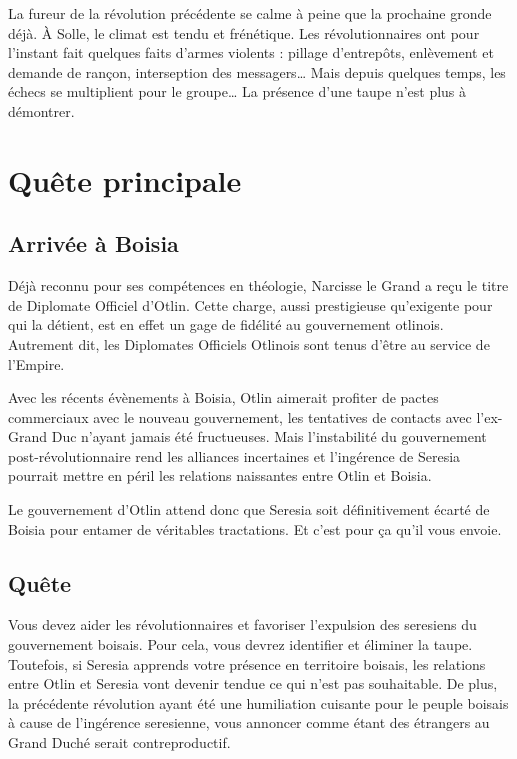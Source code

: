 \documentclass[french, a4paper, 12pt]{article}
\begin{document}
La fureur de la révolution précédente se calme à peine que la prochaine gronde déjà. À Solle, le climat est tendu et frénétique. Les révolutionnaires ont pour l'instant fait quelques faits d'armes violents : pillage d'entrepôts, enlèvement et demande de rançon, interseption des messagers… Mais depuis quelques temps, les échecs se multiplient pour le groupe… La présence d'une taupe n'est plus à démontrer.

\section{Quête principale}

\subsection{Arrivée à Boisia}

Déjà reconnu pour ses compétences en théologie, Narcisse le Grand a reçu le titre de Diplomate Officiel d'Otlin. Cette charge, aussi prestigieuse qu'exigente pour qui la détient, est en effet un gage de fidélité au gouvernement otlinois. Autrement dit, les Diplomates Officiels Otlinois sont tenus d'être au service de l'Empire.

Avec les récents évènements à Boisia, Otlin aimerait profiter de pactes commerciaux avec le nouveau gouvernement, les tentatives de contacts avec l'ex-Grand Duc n'ayant jamais été fructueuses. Mais l'instabilité du gouvernement post-révolutionnaire rend les alliances incertaines et l'ingérence de Seresia pourrait mettre en péril les relations naissantes entre Otlin et Boisia.

Le gouvernement d'Otlin attend donc que Seresia soit définitivement écarté de Boisia pour entamer de véritables tractations. Et c'est pour ça qu'il vous envoie.

\subsection{Quête}

Vous devez aider les révolutionnaires et favoriser l'expulsion des seresiens du gouvernement boisais. Pour cela, vous devrez identifier et éliminer la taupe. Toutefois, si Seresia apprends votre présence en territoire boisais, les relations entre Otlin et Seresia vont devenir tendue ce qui n'est pas souhaitable. De plus, la précédente révolution ayant été une humiliation cuisante pour le peuple boisais à cause de l'ingérence seresienne, vous annoncer comme étant des étrangers au Grand Duché serait contreproductif.
\end{document}
